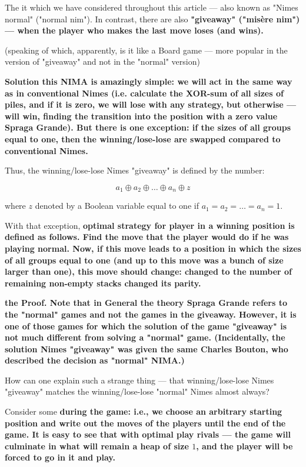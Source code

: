 The it which we have considered throughout this article --- also known as "Nimes normal" ("normal nim"). In contrast, there are also \bf{"giveaway"} ("misère nim") --- when the player who makes the last move loses (and wins).

(speaking of which, apparently, is it like a Board game --- more popular in the version of "giveaway" and not in the "normal" version)

\bf{Solution} this NIMA is amazingly simple: we will act in the same way as in conventional Nimes (i.e. calculate the XOR-sum of all sizes of piles, and if it is zero, we will lose with any strategy, but otherwise --- will win, finding the transition into the position with a zero value Spraga Grande). But there is one \bf{exception}: if the sizes of all groups equal to one, then the winning/lose-lose are swapped compared to conventional Nimes.

Thus, the winning/lose-lose Nimes "giveaway" is defined by the number:

$$ a_1 \oplus a_2 \oplus \ldots \oplus a_n \oplus z $$

where $z$ denoted by a Boolean variable equal to one if $a_1 = a_2 = \ldots = a_n = 1$.

With that exception, \bf{optimal strategy} for player in a winning position is defined as follows. Find the move that the player would do if he was playing normal. Now, if this move leads to a position in which the sizes of all groups equal to one (and up to this move was a bunch of size larger than one), this move should change: changed to the number of remaining non-empty stacks changed its parity.

\bf{the Proof}. Note that in General the theory Spraga Grande refers to the "normal" games and not the games in the giveaway. However, it is one of those games for which the solution of the game "giveaway" is not much different from solving a "normal" game. (Incidentally, the solution Nimes "giveaway" was given the same Charles Bouton, who described the decision as "normal" NIMA.)

How can one explain such a strange thing --- that winning/lose-lose Nimes "giveaway" matches the winning/lose-lose "normal" Nimes almost always?

Consider some \bf{during the game}: i.e., we choose an arbitrary starting position and write out the moves of the players until the end of the game. It is easy to see that with optimal play rivals --- the game will culminate in what will remain a heap of size $1$, and the player will be forced to go in it and play.

